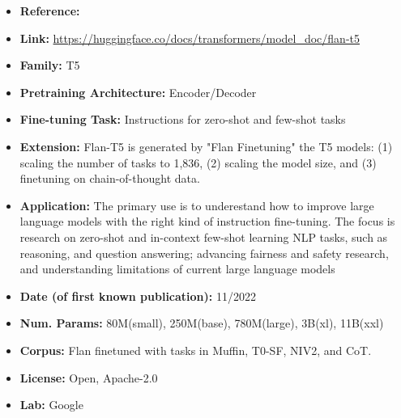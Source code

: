 \documentclass{article}
\begin{document}
            \begin{itemize}
                \item \textbf{Reference:} \href{https://arxiv.org/abs/2210.11416}{}
                \item \textbf{Link:} \url{https://huggingface.co/docs/transformers/model_doc/flan-t5}
                \item \textbf{Family:} T5 
                \item \textbf{Pretraining Architecture:} Encoder/Decoder
                \item \textbf{Fine-tuning Task:} Instructions for zero-shot and few-shot tasks
                \item \textbf{Extension:} Flan-T5 is generated by "Flan Finetuning" the T5 models: (1) scaling the number of tasks to 1,836, (2) scaling the model size, and (3) finetuning on chain-of-thought data.
                \item \textbf{Application:} The primary use is to underestand how to improve large language models with the right kind of instruction fine-tuning. The focus is research on zero-shot and in-context few-shot learning NLP tasks, such as reasoning, and question answering; advancing fairness and safety research, and understanding limitations of current large language models
                \item \textbf{Date (of first known publication):} 11/2022
                \item \textbf{Num. Params:} 80M(small), 250M(base), 780M(large), 3B(xl), 11B(xxl)
                \item \textbf{Corpus:} Flan finetuned with tasks in Muffin, T0-SF, NIV2, and CoT.
                \item \textbf{License:} Open, Apache-2.0
                \item \textbf{Lab:} Google
            \end{itemize}

\end{document}
